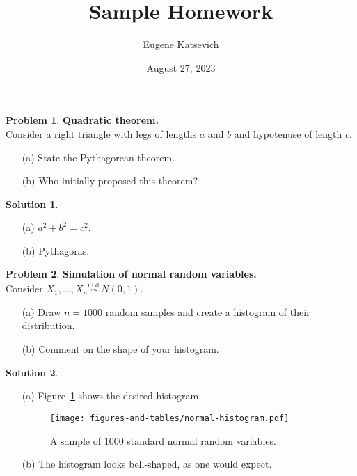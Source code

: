 \documentclass[11pt,letterpaper,english,oneside]{article} %
\author{Eugene Katsevich}
\title{Sample Homework}
\date{August 27, 2023}
\theoremstyle{definition} %
\newtheorem{problem}{Problem}
\newtheorem{solution}{Solution}
\newenvironment{prob}{\clearpage \begin{problem}\hspace{0pt}}{\end{problem}}
\newenvironment{sol}{\begin{solution}\hspace{0pt}}{\end{solution}}
\begin{document}
\maketitle

\begin{prob} \textbf{Quadratic theorem.} \\

\noindent Consider a right triangle with legs of lengths $a$ and $b$ and hypotenuse of length $c$.
\begin{enumerate}
\item[(a)] State the Pythagorean theorem.
\item[(b)] Who initially proposed this theorem?
\end{enumerate}

\end{prob}

\begin{sol}

\begin{enumerate}
  \item[(a)] $a^2 + b^2 = c^2.$
  \item[(b)] Pythagoras.
\end{enumerate}


\end{sol}

\begin{prob} \textbf{Simulation of normal random variables.} \\

\noindent Consider $X_1, \dots, X_n \overset{\text{i.i.d.}}\sim N(0,1)$.
\begin{enumerate}
\item[(a)] Draw $n = 1000$ random samples and create a histogram of their distribution.
\item[(b)] Comment on the shape of your histogram.
\end{enumerate}

\end{prob}
\begin{sol}

\begin{enumerate}
\item[(a)] Figure~\ref{fig:std-norm-hist} shows the desired histogram.

\begin{figure}[h!]
\centering
\texttt{[image: figures-and-tables/normal-histogram.pdf]}
\caption{A sample of 1000 standard normal random variables.}
\label{fig:std-norm-hist}
\end{figure}

\item[(b)] The histogram looks bell-shaped, as one would expect.
\end{enumerate}

\end{sol}
\end{document}

